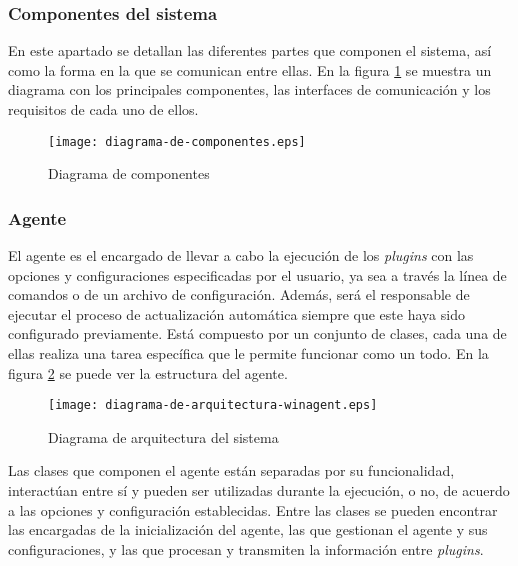         \subsubsection{Componentes del sistema}
            En este apartado se detallan las diferentes partes que componen el sistema, así como la forma en la que se comunican entre ellas. En la figura \ref{fig:diagrama-de-componentes} se muestra un diagrama con los principales componentes, las interfaces de comunicación y los requisitos de cada uno de ellos.

            \begin{figure}[h!]
            \centering
                \texttt{[image: diagrama-de-componentes.eps]}
                \caption{Diagrama de componentes}
                \label{fig:diagrama-de-componentes}
            \end{figure}

        \subsubsection{Agente}
            El agente es el encargado de llevar a cabo la ejecución de los \textit{plugins} con las opciones y configuraciones especificadas por el usuario, ya sea a través la línea de comandos o de un archivo de configuración. Además, será el responsable de ejecutar el proceso de actualización automática siempre que este haya sido configurado previamente. Está compuesto por un conjunto de clases, cada una de ellas realiza una tarea específica que le permite funcionar como un todo. En la figura \ref{fig:diagrama-de-arquitectura-winagent} se puede ver la estructura del agente.
            
            \begin{figure}[h!]
            \centering
                \texttt{[image: diagrama-de-arquitectura-winagent.eps]}
                \caption{Diagrama de arquitectura del sistema}
                \label{fig:diagrama-de-arquitectura-winagent}
            \end{figure}

            Las clases que componen el agente están separadas por su funcionalidad, interactúan entre sí y pueden ser utilizadas durante la ejecución, o no, de acuerdo a las opciones y configuración establecidas. Entre las clases se pueden encontrar las encargadas de la inicialización del agente, las que gestionan el agente y sus configuraciones, y las que procesan y transmiten la información entre \textit{plugins}.
            
